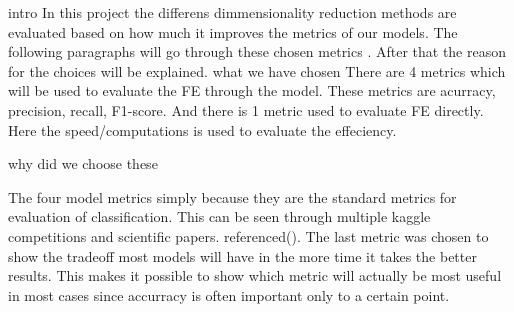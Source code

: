 intro
In this project the differens dimmensionality reduction methods are evaluated based on how much it improves the metrics of our models. The following paragraphs will go through these chosen metrics
. After that the reason for the choices will be explained.
what we have chosen
There are 4 metrics which will be used to evaluate the FE through the model. These metrics are acurracy, precision, recall, F1-score. And there is 1 metric used to evaluate FE directly.
Here the speed/computations is used to evaluate the effeciency.

why did we choose these

The four model metrics simply because they are the standard metrics for evaluation of classification. This can be seen through multiple kaggle competitions and scientific papers.
referenced(). The last metric was chosen to show the tradeoff most models will have in the more time it takes the better results. This makes it possible to show which metric will actually be most useful
in most cases since accurracy is often important only to a certain point.